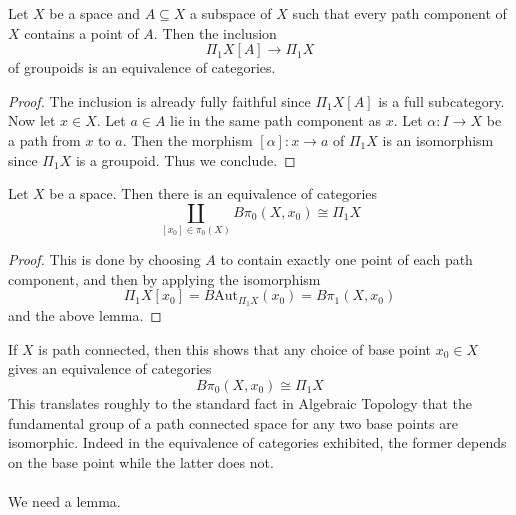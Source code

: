 \documentclass[a4paper]{article}
\begin{document}
\begin{lmm}{}{} Let $X$ be a space and $A\subseteq X$ a subspace of $X$ such that every path component of $X$ contains a point of $A$. Then the inclusion $$\Pi_1X[A]\to\Pi_1X$$ of groupoids is an equivalence of categories. \tcbline
\begin{proof}
The inclusion is already fully faithful since $\Pi_1X[A]$ is a full subcategory. Now let $x\in X$. Let $a\in A$ lie in the same path component as $x$. Let $\alpha:I\to X$ be a path from $x$ to $a$. Then the morphism $[\alpha]:x\to a$ of $\Pi_1X$ is an isomorphism since $\Pi_1X$ is a groupoid. Thus we conclude. 
\end{proof}
\end{lmm}

\begin{crl}{}{} Let $X$ be a space. Then there is an equivalence of categories $$\coprod_{[x_0]\in\pi_0(X)}B\pi_0(X,x_0)\cong\Pi_1X$$ \tcbline
\begin{proof}
This is done by choosing $A$ to contain exactly one point of each path component, and then by applying the isomorphism $$\Pi_1X[x_0]=B\text{Aut}_{\Pi_1X}(x_0)=B\pi_1(X,x_0)$$ and the above lemma. 
\end{proof}
\end{crl}

If $X$ is path connected, then this shows that any choice of base point $x_0\in X$ gives an equivalence of categories $$B\pi_0(X,x_0)\cong\Pi_1X$$ This translates roughly to the standard fact in Algebraic Topology that the fundamental group of a path connected space for any two base points are isomorphic. Indeed in the equivalence of categories exhibited, the former depends on the base point while the latter does not. \\~\\

We need a lemma. 
\end{document}
